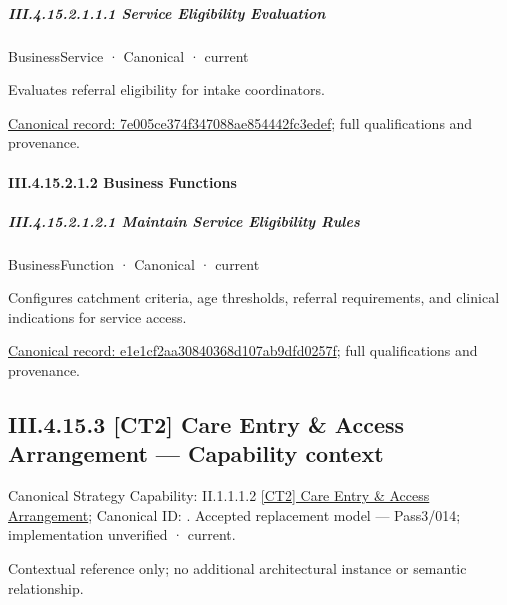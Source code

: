 \subparagraph*{III.4.15.2.1.1.1 Service Eligibility Evaluation}
\label{navigation:III.4.15.2.1.1.1}

\label{element:7e005ce374f347088ae854442fc3edef}
{\small BusinessService · Canonical · current}\par

Evaluates referral eligibility for intake coordinators.


{\footnotesize \href{../../../../../../../continuum/business/business-service/7e005ce374f347088ae854442fc3edef.md}{Canonical record: 7e005ce374f347088ae854442fc3edef}; full qualifications and provenance.}\par
\paragraph*{III.4.15.2.1.2 Business Functions}
\label{navigation:III.4.15.2.1.2}

\subparagraph*{III.4.15.2.1.2.1 Maintain Service Eligibility Rules}
\label{navigation:III.4.15.2.1.2.1}

\label{element:e1e1cf2aa30840368d107ab9dfd0257f}
{\small BusinessFunction · Canonical · current}\par

Configures catchment criteria, age thresholds, referral requirements, and clinical indications for service access.


{\footnotesize \href{../../../../../../../continuum/business/business-function/e1e1cf2aa30840368d107ab9dfd0257f.md}{Canonical record: e1e1cf2aa30840368d107ab9dfd0257f}; full qualifications and provenance.}\par
\subsection*{III.4.15.3 [CT2] Care Entry \& Access Arrangement — Capability context}
\label{navigation:III.4.15.3}

{\small Canonical Strategy Capability: II.1.1.1.2 \hyperref[element:199f8d09f6304730a17cfe6ce79a9282]{[CT2] Care Entry \& Access Arrangement}; Canonical ID: \texttt{}. Accepted replacement model — Pass3/014; implementation unverified · current.}\par
Contextual reference only; no additional architectural instance or semantic relationship.\par
